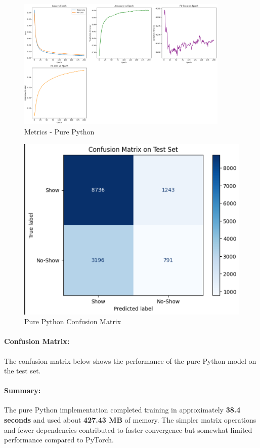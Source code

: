 \documentclass[12pt]{article}
\begin{document}
\begin{figure}[H]
    \centering
    \includegraphics[width=0.9\textwidth]{pure_py_metrics.png}
    \caption{Metrics - Pure Python}
\end{figure}

\begin{figure}[H]
    \centering
    \includegraphics[width=0.5\linewidth]{pure_python_cm.png}
    \caption{Pure Python Confusion Matrix}
    \label{fig:purepy_cm}
\end{figure}


\paragraph{Confusion Matrix:}  
The confusion matrix below shows the performance of the pure Python model on the test set.

\paragraph{Summary:}  
The pure Python implementation completed training in approximately \textbf{38.4 seconds} and used about \textbf{427.43 MB} of memory. The simpler matrix operations and fewer dependencies contributed to faster convergence but somewhat limited performance compared to PyTorch.
\end{document}
